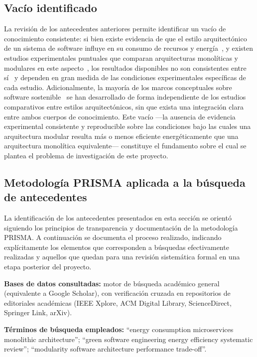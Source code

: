 \subsection{Vacío identificado}
\label{sec:vacio}

La revisión de los antecedentes anteriores permite identificar un vacío de conocimiento consistente: si bien existe evidencia de que el estilo arquitectónico de un sistema de software influye en su consumo de recursos y energía~\cite{jagroep2017extending,seo2008framework}, y existen estudios experimentales puntuales que comparan arquitecturas monolíticas y modulares en este aspecto~\cite{capuano2026comparative}, los resultados disponibles no son consistentes entre sí~\cite{araujo2024energy} y dependen en gran medida de las condiciones experimentales específicas de cada estudio. Adicionalmente, la mayoría de los marcos conceptuales sobre software sostenible~\cite{kern2018sustainable,kipp2011green,kipp2012layered} se han desarrollado de forma independiente de los estudios comparativos entre estilos arquitectónicos, sin que exista una integración clara entre ambos cuerpos de conocimiento. Este vacío ---la ausencia de evidencia experimental consistente y reproducible sobre las condiciones bajo las cuales una arquitectura modular resulta más o menos eficiente energéticamente que una arquitectura monolítica equivalente--- constituye el fundamento sobre el cual se plantea el problema de investigación de este proyecto.

\subsection{Metodología PRISMA aplicada a la búsqueda de antecedentes}
\label{sec:prisma}

La identificación de los antecedentes presentados en esta sección se orientó siguiendo los principios de transparencia y documentación de la metodología PRISMA. A continuación se documenta el proceso realizado, indicando explícitamente los elementos que corresponden a búsquedas efectivamente realizadas y aquellos que quedan para una revisión sistemática formal en una etapa posterior del proyecto.

\textbf{Bases de datos consultadas:} motor de búsqueda académico general (equivalente a Google Scholar), con verificación cruzada en repositorios de editoriales académicas (IEEE Xplore, ACM Digital Library, ScienceDirect, Springer Link, arXiv).

\textbf{Términos de búsqueda empleados:} ``energy consumption microservices monolithic architecture''; ``green software engineering energy efficiency systematic review''; ``modularity software architecture performance trade-off''.

